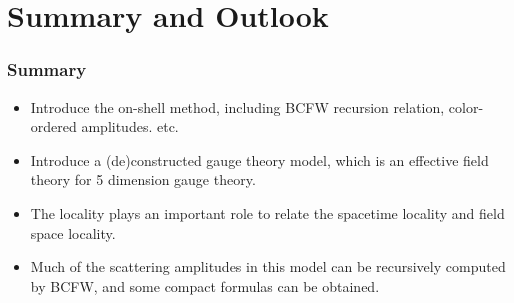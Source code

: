 \documentclass{beamer}
\begin{document}
\section{Summary and Outlook}
\begin{frame}
    \frametitle{Summary}
    \begin{itemize}
        \item Introduce the on-shell method, including BCFW recursion relation, color-ordered amplitudes. etc.
        \item Introduce a (de)constructed gauge theory model, which is an effective field theory for 5 dimension gauge theory.
        \item The locality plays an important role to relate the spacetime locality and field space locality.
        \item Much of the scattering amplitudes in this model can be recursively computed by BCFW, and some compact formulas can be obtained.
    \end{itemize}
\end{frame}
\end{document}
